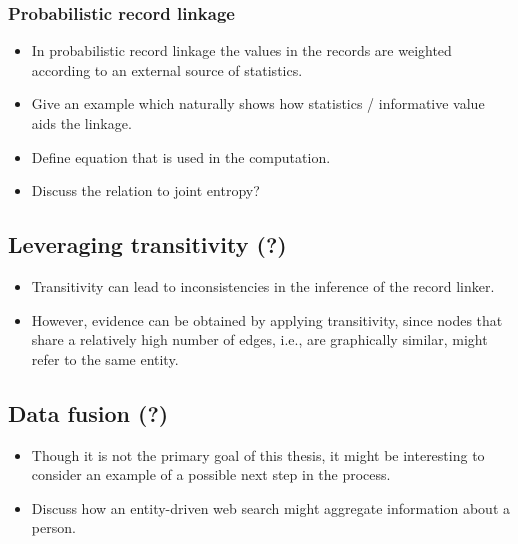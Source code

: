 

\subsubsection{Probabilistic record linkage}
\begin{itemize}
    \item In probabilistic record linkage the values in the records are weighted according to an external source of statistics.
    \item Give an example which naturally shows how statistics / informative value aids the linkage.
    \item Define equation that is used in the computation.
    \item Discuss the relation to joint entropy?
\end{itemize}




\subsection{Leveraging transitivity (?)}
\begin{itemize}
    \item Transitivity can lead to inconsistencies in the inference of the record linker.
    \item However, evidence can be obtained by applying transitivity, since nodes that share a relatively high number of edges, i.e., are graphically similar, might refer to the same entity.
\end{itemize}




\subsection{Data fusion (?)}
\begin{itemize}
    \item Though it is not the primary goal of this thesis, it might be interesting to consider an example of a possible next step in the process.
    \item Discuss how an entity-driven web search might aggregate information about a person.
\end{itemize}
